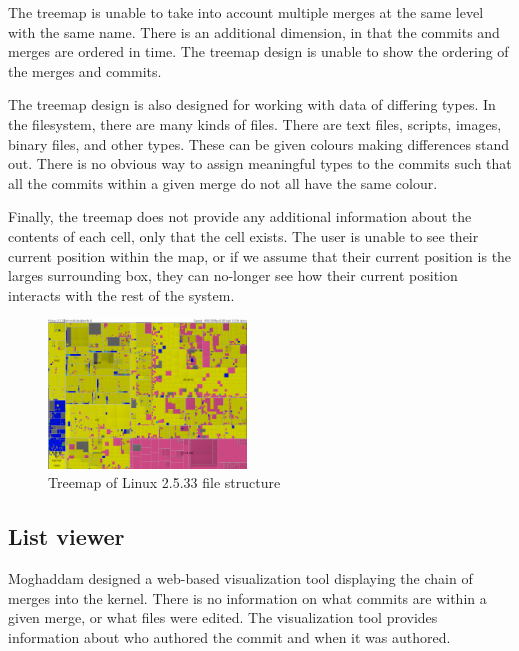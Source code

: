 \documentclass[conference, draftclsnofoot]{IEEEtran}
\begin{document}
The treemap is unable to take into account multiple merges at the same level
with the same name. There is an additional dimension, in that the commits and
merges are ordered in time. The treemap design is unable to show the ordering
of the merges and commits.

The treemap design is also designed for working with data of differing types.
In the filesystem, there are many kinds of files.  There are text files,
scripts, images, binary files, and other types. These can be given colours
making differences stand out. There is no obvious way to assign meaningful
types to the commits such that all the commits within a given merge do not all
have the same colour.

Finally, the treemap does not provide any additional information about the
contents of each cell, only that the cell exists. The user is unable to see
their current position within the map, or if we assume that their current
position is the larges surrounding box, they can no-longer see how their
current position interacts with the rest of the system.

\begin{figure}[h!]
	\centering
	\includegraphics[width=0.47\textwidth]{figures/kernel-files.png}
	\caption{Treemap of Linux 2.5.33 file structure}
	\label{fig:treemap}
\end{figure}


\subsection{List viewer}
Moghaddam designed a web-based visualization tool displaying the chain of
merges into the kernel. There is no information on what commits are within a
given merge, or what files were edited. The visualization tool provides
information about who authored the commit and when it was authored.
\end{document}
